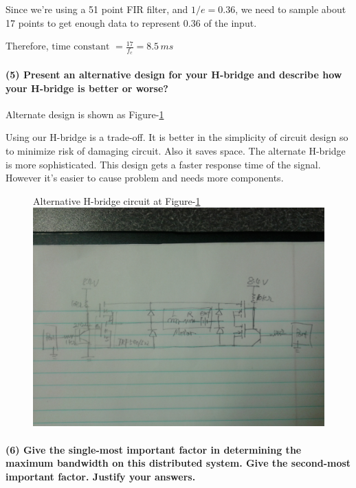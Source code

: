 \documentclass[a4paper]{article}
\newlength{\pic}
\begin{document}
Since we're using a 51 point FIR filter, and $1/e = 0.36$, we need to sample about 17 points to get enough data to represent 0.36 of the input. 

Therefore, $\text{time constant } = \frac{17}{f_c} = 8.5 \, ms$

\paragraph{(5) Present an alternative design for your H-bridge and describe how your H-bridge is better or worse? \\ }

Alternate design is shown as Figure-\ref{hbridge}

Using our H-bridge is a trade-off. It is better in the simplicity of circuit design so to minimize risk of damaging circuit. Also it saves space. The alternate H-bridge is more sophisticated. This design gets a faster response time of the signal. However it's easier to cause problem and needs more components.

\setlength{\pic}{0.8\textwidth}
\begin{figure}[htp]
\noindent Alternative H-bridge circuit at Figure-\ref{hbridge}
\center
\includegraphics[width=\pic]{circuits/Alternate_H-bridge}
\caption{ }
\label{hbridge}
\end{figure}

\paragraph{(6) Give the single-most important factor in determining the maximum bandwidth on this distributed system.
Give the second-most important factor. Justify your answers.  \\ }
\end{document}
